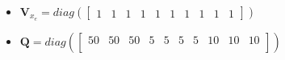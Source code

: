 \documentclass{thesisreport}
\begin{document}
\begin{itemize}
	\item $\bm{V}_{x_e} = diag(
	\begin{bmatrix}
			1 & 1 & 1 & 1 & 1 & 1 & 1 & 1 & 1 & 1
	\end{bmatrix})
	$
	
	\item $\bm{Q} = diag(
	\begin{bmatrix}
			50 & 50 & 50 & 5 & 5 & 5 & 5 & 10 & 10 & 10\\
	\end{bmatrix})$
	

\end{itemize}
\end{document}
